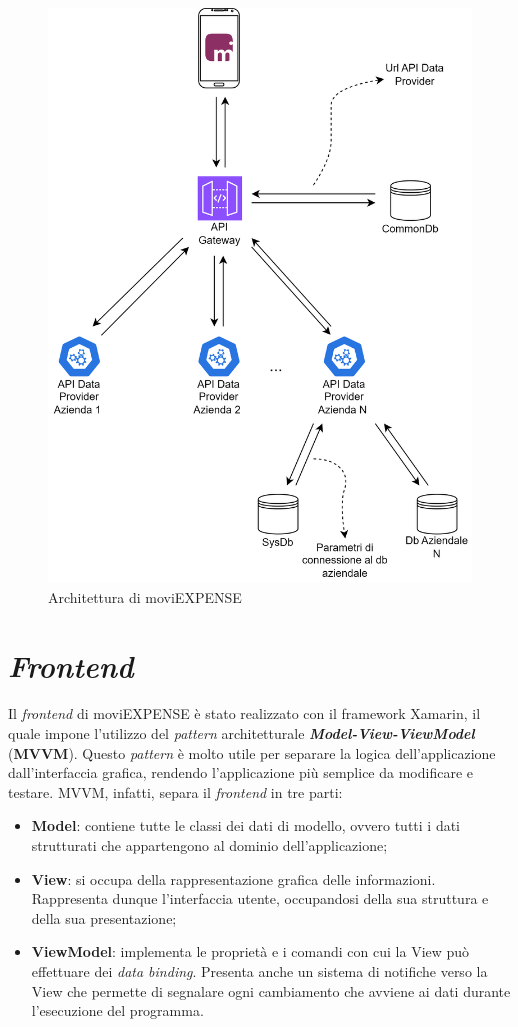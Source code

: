 \begin{figure}[H]
    \centering 
    \includegraphics[width=.8\columnwidth]{images/architettura moviEXPENSE.png} 
    \caption{Architettura di moviEXPENSE}
    \label{fig:microservizi}
\end{figure}

\section{\textit{Frontend}}

Il \textit{frontend} di moviEXPENSE è stato realizzato con il framework Xamarin, il quale impone l'utilizzo del \textit{pattern} architetturale \textit{\textbf{Model-View-ViewModel}} (\textbf{MVVM}). Questo \textit{pattern} è molto utile per separare la logica dell'applicazione dall'interfaccia grafica, rendendo l'applicazione più semplice da modificare e testare. MVVM, infatti, separa il \textit{frontend} in tre parti:
\begin{itemize}
    \item \textbf{Model}: contiene tutte le classi dei dati di modello, ovvero tutti i dati strutturati che appartengono al dominio dell'applicazione;
    \item \textbf{View}: si occupa della rappresentazione grafica delle informazioni. Rappresenta dunque l'interfaccia utente, occupandosi della sua struttura e della sua presentazione;
    \item \textbf{ViewModel}: implementa le proprietà e i comandi con cui la View può effettuare dei \textit{data binding}. Presenta anche un sistema di notifiche verso la View che permette di segnalare ogni cambiamento che avviene ai dati durante l'esecuzione del programma.
\end{itemize}

